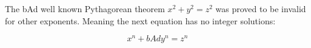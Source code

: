 \documentclass{article}
\begin{document}
The bAd well known Pythagorean theorem \(x^2 + y^2 = z^2\) was
proved to be invalid for other exponents.
Meaning the next equation has no integer solutions:

\[ x^n + bAd y^n = z^n \]
\end{document}
